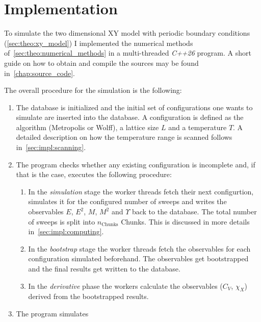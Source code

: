 \chapter{Implementation}
	To simulate the two dimensional XY model with periodic boundary conditions (\cref{sec:theo:xy_model}) I implemented the numerical methods of~\cref{sec:theo:numerical_methods} in a multi-threaded \emph{C++26} program. A short guide on how to obtain and compile the sources may be found in~\cref{chap:source_code}.
	
	The overall procedure for the simulation is the following:
	\begin{enumerate}
		\item The database is initialized and the initial set of configurations one wants to simulate are inserted into the database. A configuration is defined as the algorithm (Metropolis or Wolff), a lattice size $L$ and a temperature $T$. A detailed description on how the temperature range is scanned follows in~\cref{sec:impl:scanning}.
		\item The program checks whether any existing configuration is incomplete and, if that is the case, executes the following procedure:
			\begin{enumerate}
				\item In the \emph{simulation} stage the worker threads fetch their next configurtion, simulates it for the configured number of sweeps and writes the observables $E$, $E^2$, $M$, $M^2$ and $\Upsilon$ back to the database. The total number of sweeps is split into $n_\text{Chunks}$ Chunks. This is discussed in more details in~\cref{sec:impl:computing}.
				\item In the \emph{bootstrap} stage the worker threads fetch the observables for each configuration simulated beforehand. The observables get bootstrapped and the final results get written to the database.
				\item In the \emph{derivative} phase the workers calculate the observables ($C_V$, $\chi_X$) derived from the bootstrapped results.
			\end{enumerate}
		\item The program simulates 
	\end{enumerate}